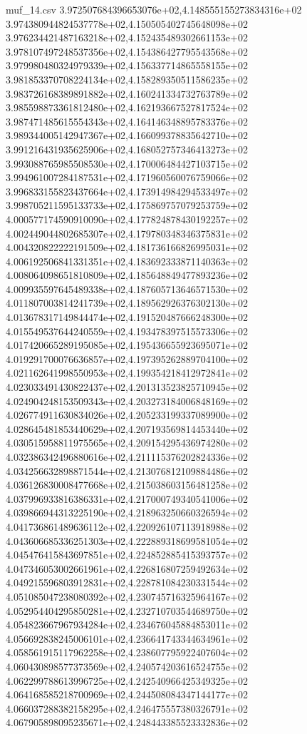 \begin{filecontents*}{muf_14.csv}
3.972507684396653076e+02,4.148555155273834316e+02
3.974380944824537778e+02,4.150505402745648098e+02
3.976234421487163218e+02,4.152435489302661153e+02
3.978107497248537356e+02,4.154386427795543568e+02
3.979980480324979339e+02,4.156337714865558155e+02
3.981853370708224134e+02,4.158289350511586235e+02
3.983726168389891882e+02,4.160241334732763789e+02
3.985598873361812480e+02,4.162193667527817524e+02
3.987471485615554343e+02,4.164146348895783376e+02
3.989344005142947367e+02,4.166099378835642710e+02
3.991216431935625906e+02,4.168052757346413273e+02
3.993088765985508530e+02,4.170006484427103715e+02
3.994961007284187531e+02,4.171960560076759066e+02
3.996833155823437664e+02,4.173914984294533497e+02
3.998705211595133733e+02,4.175869757079253759e+02
4.000577174590910090e+02,4.177824878430192257e+02
4.002449044802685307e+02,4.179780348346375831e+02
4.004320822222191509e+02,4.181736166826995031e+02
4.006192506841331351e+02,4.183692333871140363e+02
4.008064098651810809e+02,4.185648849477893236e+02
4.009935597645489338e+02,4.187605713646571530e+02
4.011807003814241739e+02,4.189562926376302130e+02
4.013678317149844474e+02,4.191520487666248300e+02
4.015549537644240559e+02,4.193478397515573306e+02
4.017420665289195085e+02,4.195436655923695071e+02
4.019291700076636857e+02,4.197395262889704100e+02
4.021162641998550953e+02,4.199354218412972841e+02
4.023033491430822437e+02,4.201313523825710945e+02
4.024904248153509343e+02,4.203273184006848169e+02
4.026774911630834026e+02,4.205233199337089900e+02
4.028645481853440629e+02,4.207193569814453440e+02
4.030515958811975565e+02,4.209154295436974280e+02
4.032386342496880616e+02,4.211115376202824336e+02
4.034256632898871544e+02,4.213076812109884486e+02
4.036126830008477668e+02,4.215038603156481258e+02
4.037996933816386331e+02,4.217000749340541006e+02
4.039866944313225190e+02,4.218963250660326594e+02
4.041736861489636112e+02,4.220926107113918988e+02
4.043606685336251303e+02,4.222889318699581054e+02
4.045476415843697851e+02,4.224852885415393757e+02
4.047346053002661961e+02,4.226816807259492634e+02
4.049215596803912831e+02,4.228781084230331544e+02
4.051085047238080392e+02,4.230745716325964167e+02
4.052954404295850281e+02,4.232710703544689750e+02
4.054823667967934284e+02,4.234676045884853011e+02
4.056692838245006101e+02,4.236641743344634961e+02
4.058561915117962258e+02,4.238607795922407604e+02
4.060430898577373569e+02,4.240574203616524755e+02
4.062299788613996725e+02,4.242540966425349325e+02
4.064168585218700969e+02,4.244508084347144177e+02
4.066037288382158295e+02,4.246475557380326791e+02
4.067905898095235671e+02,4.248443385523332836e+02

\end{filecontents*}
